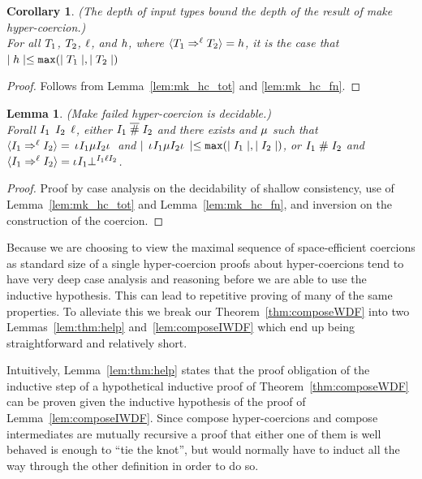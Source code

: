 \documentclass[acmtog, authorversion, acmlarge]{acmart}
\newtheorem{lem}{Lemma}
\newtheorem{cor}{Corollary}
\begin{document}
\begin{cor}
  \label{lem:mk_hc_depth}
  (The depth of input types bound the depth of the result of make hyper-coercion.)\\
  For all $T_1$, $T_2$, $\ell$, and $h$,
  where $\langle T_1 \Rightarrow^{\ell} T_2 \rangle = h$, 
  it is the case that
  $\mid h \mid \le \texttt{max}(\mid T_1 \mid, \mid T_2 \mid)$
\end{cor}
\begin{proof}
  Follows from Lemma~\ref{lem:mk_hc_tot} and \ref{lem:mk_hc_fn}. 
\end{proof}


\begin{lem}
  \label{lem:mk_hc_dec}
  (Make failed hyper-coercion is decidable.)\\
  Forall $I_1$ $I_2$ $\ell$,
  either $I_1 \; \overline{\#} \; I_2$ and there exists and $\mu$
  such that $\langle I_1 \Rightarrow^{\ell} I_2 \rangle = \, \iota_{} I_1 \mu I_2 \iota_{} \,$
  and $\mid \, \iota_{} I_1 \mu I_2 \iota_{} \, \mid
  \le \texttt{max}(\mid I_1 \mid, \mid I_2 \mid)$,
  or $I_1 \; \# \; I_2$ and
  $\langle I_1 \Rightarrow^{\ell} I_2 \rangle = \iota_{} I_1 \bot^{I_1 \ell I_2}$.
\end{lem}
\begin{proof}
  Proof by case analysis on the decidability of shallow consistency,
  use of Lemma~\ref{lem:mk_hc_tot} and Lemma~\ref{lem:mk_hc_fn}, and
  inversion on the construction of the coercion. 
\end{proof}

Because we are choosing to view the maximal sequence of
space-efficient coercions as standard size of a single hyper-coercion
proofs about hyper-coercions tend to have very deep case analysis and
reasoning before we are able to use the inductive hypothesis. This can
lead to repetitive proving of many of the same properties. To
alleviate this we break our Theorem~\ref{thm:composeWDF} into two
Lemmas~\ref{lem:thm:help} and~\ref{lem:composeIWDF} which end up being straightforward and relatively short.

Intuitively, Lemma~\ref{lem:thm:help} states that the proof obligation
of the inductive step of a hypothetical inductive proof of
Theorem~\ref{thm:composeWDF} can be proven given the inductive
hypothesis of the proof of Lemma~\ref{lem:composeIWDF}. Since
compose hyper-coercions and compose intermediates are mutually
recursive a proof that either one of them is well behaved is
enough to ``tie the knot'', but would normally have to induct
all the way through the other definition in order to do so.
\end{document}
